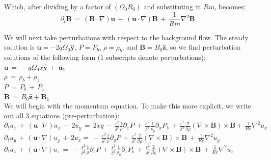 \documentclass[letterpaper,12pt]{article}
\newcommand\reye{\mathrel{Re}}
\newcommand\reym{\mathrel{Rm}}
\begin{document}
Which, after dividing by a factor of $\left(\Omega_0 B_0\right)$ and substituting in $\reym$, becomes: \\

\[\partial_t\mathbf{B} \, = \, \left(\mathbf{B} \cdot \nabla \right)\mathbf{u} \, -\, \left(\mathbf{u} \cdot \nabla \right)\mathbf{B} \, + \, \frac{1}{\reym}\nabla^2\mathbf{B} \]

We will next take perturbations with respect to the background flow. The steady solution is $\mathbf{u} = -2 q \Omega_0 \mathbf{\hat{y}}$, $P = P_b$, $\rho = \rho_b$, and $\mathbf{B} = B_0 \mathbf{\hat{z}}$, so we find perturbation solutions of the following form (1 subscripts denote perturbations): \\

$\mathbf{u} \, = \, -q \Omega_0 x \mathbf{\hat{y}} \, + \, \mathbf{u_1}$ \\

$\rho \, = \, \rho_b + \rho_1$ \\

$P \, = \, P_b \, + \, P_1$ \\

$\mathbf{B} \, = \, B_0\mathbf{\hat{z}} + \mathbf{B_1}$ \\

We will begin with the momentum equation. To make this more explicit, we write out all 3 equations (pre-perturbation): \\

$\partial_t u_x \, + \, \left(\mathbf{u} \cdot \nabla\right)u_x \, - \, 2 u_y \, = \, 2 x q \, - \, \frac{\varepsilon^2}{\delta^2} \frac{1}{\rho} \partial_x P \, + \, \frac{\varepsilon^2}{\delta^2} \frac{1}{\rho_b} \partial_x P_b \, +\, \frac{\varepsilon^2}{\delta^2} \frac{2}{\beta \rho} \left( \nabla \times \mathbf{B} \right) \times \mathbf{B} + \, \frac{1}{\reye}\nabla^2 u_x  $ \\

$\partial_t u_y \, + \, \left(\mathbf{u} \cdot \nabla\right)u_y \, + \, 2u_x =  \, - \, \frac{\varepsilon^2}{\delta^2} \frac{1}{\rho} \partial_y P \, +\, \frac{\varepsilon^2}{\delta^2} \frac{2}{\beta \rho} \left( \nabla \times \mathbf{B} \right) \times \mathbf{B} \, + \, \frac{1}{\reye}\nabla^2 u_y  $ \\

$\partial_t u_z \, + \, \left(\mathbf{u} \cdot \nabla\right)u_z \,  =  \, - \, \frac{\varepsilon^2}{\delta^2} \frac{1}{\rho} \partial_z P \,  + \, \frac{\varepsilon^2}{\delta^2} \frac{1}{\rho_b} \partial_z P_b \, +\, \frac{\varepsilon^2}{\delta^2} \frac{2}{\beta \rho} \left( \nabla \times \mathbf{B} \right) \times \mathbf{B} \, + \, \frac{1}{\reye}\nabla^2 u_z $ \\
\end{document}
